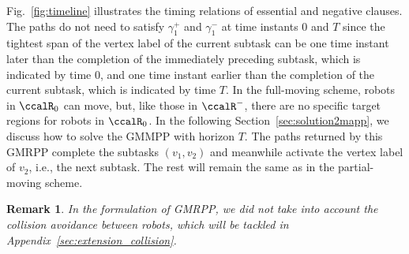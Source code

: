 \documentclass[Afour,sageh,times]{sagej}
\newtheorem{rem}[thm]{Remark}
\newcommand{\vertex}[1]{v_{\textup{#1}}}
\begin{document}
{{Fig.~\ref{fig:timeline} illustrates the timing relations of essential and negative clauses.  The paths do not need to satisfy  $\gamma_1^+$ and $\gamma_1^-$ at time instants 0 and  $T$ since the tightest span of the vertex label of the current subtask can be one time instant later than the completion of the immediately preceding subtask, which is indicated by time 0, and one time instant earlier than the completion of the current subtask, which is indicated by time $T$. In the full-moving scheme, robots in $\ccalR_0$ can move, but, like those in $\ccalR^-$, there are no specific target regions for robots in $\ccalR_0$.  In the following Section~\ref{sec:solution2mapp}, we discuss how to solve the GMMPP with horizon $T$.  The paths returned by this GMRPP complete the subtasks $(v_1, v_2)$  and meanwhile activate the vertex label of $v_2$, i.e., the next subtask. %
 The rest will remain the same as in the partial-moving scheme.

 \begin{rem}
  In the formulation of GMRPP, we did not take into account the collision avoidance between robots, which will be tackled in Appendix~\ref{sec:extension_collision}.
\end{rem}




}}
\end{document}
